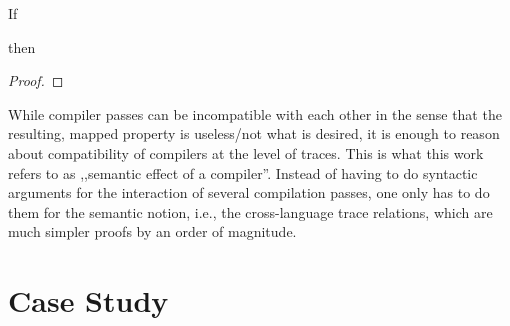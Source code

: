 \documentclass[a4paper,12pt]{article}
\begin{document}
\begin{lemma}[\Coqed]{}
  If 
  \begin{assumptions}
  \end{assumptions}
  then
  \begin{goals}
  \end{goals}
\end{lemma}
\begin{proof}
  \incompleteProof
\end{proof}

While compiler passes can be incompatible with each other in the sense that the resulting, mapped property is useless/not what is desired, it is enough to reason about compatibility of compilers at the level of traces.
This is what this work refers to as ,,semantic effect of a compiler''.
Instead of having to do syntactic arguments for the interaction of several compilation passes, one only has to do them for the semantic notion, i.e., the cross-language trace relations, which are much simpler proofs by an order of magnitude. 

\section{Case Study}

\clearpage



\printglossary
\end{document}
